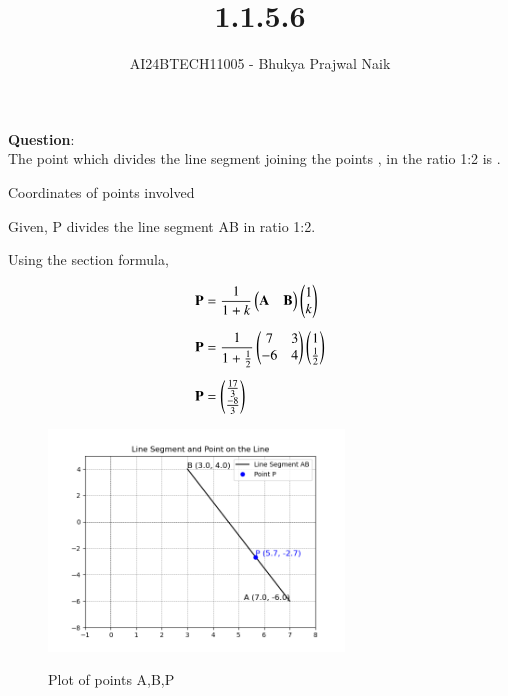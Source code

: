 \documentclass[journal]{IEEEtran}
\begin{document}

\vspace{3cm}

\title{1.1.5.6}
\author{AI24BTECH11005 - Bhukya Prajwal Naik
}
{\let\newpage\relax\maketitle}

\renewcommand{\thefigure}{\theenumi}
\renewcommand{\thetable}{\theenumi}
\setlength{\intextsep}{10pt} %


\renewcommand{\thetable}{\theenumi}


\textbf{Question}:\\
 The point which divides the line segment joining the points  , in the ratio 1:2 is .
\solution

\begin{table}[h!]
	\centering
	
	\caption{Coordinates of points involved}
	\label{tab:coordinates}
\end{table}

Given, P divides the line segment AB in ratio 1:2.

Using the section formula,

\begin{align}
	\mathbf{P} &= \frac{1}{1+k}\begin{pmatrix}\mathbf{A} & \mathbf{B}\end{pmatrix}\begin{pmatrix}1 \\ k\end{pmatrix} \\[5pt]
	\mathbf{P} &= \frac{1}{1+\frac{1}{2}}\begin{pmatrix}7 &3\\-6 & 4\end{pmatrix}\begin{pmatrix}1 \\ \frac{1}{2}\end{pmatrix}\\[5pt]
	\mathbf{P} &= \begin{pmatrix}\frac{17}{3} \\ \frac{-8}{3}\end{pmatrix}
\end{align}

\begin{figure}[h!]
	\centering
	\includegraphics[width=0.7\textwidth]{Figure_1.png}
	\label{Graph}
	\caption{Plot of points A,B,P}
        \end{figure}
\end{document}
